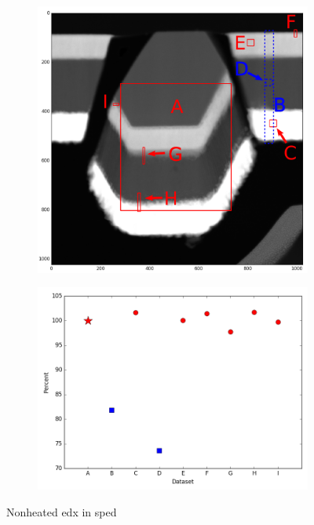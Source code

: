 \begin{figure}
	\begin{subfigure}{.5\textwidth}
		\centering
		\includegraphics[width=\linewidth]{fig/nonheated-img-in-overview}
		\caption{}
		\label{fig:nonheated-images-in-overview}
	\end{subfigure}%
	\begin{subfigure}{.5\textwidth}
		\centering
		\includegraphics[width=\linewidth]{fig/nonheated-matching-values}
		\caption{}
		\label{fig:nonheated-matching-values}
	\end{subfigure}
	\caption{Nonheated edx in sped}
	\label{fig:nonheated-overview}
\end{figure}


